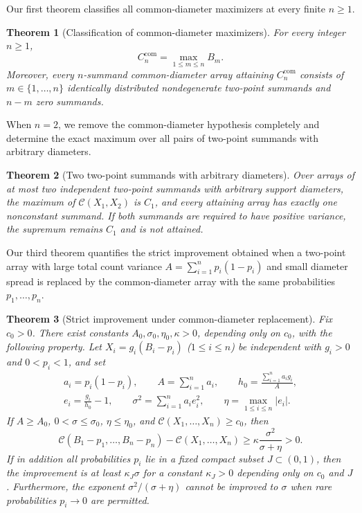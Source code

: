 \documentclass[11pt]{article}
\numberwithin{equation}{section}
\newtheorem{theorem}{Theorem}[section]
\theoremstyle{remark}
\begin{document}
Our first theorem classifies all common-diameter maximizers at every finite
$n\ge1$.

\begin{theorem}[Classification of common-diameter maximizers]\label{thm:common}
For every integer $n\ge1$,
\[
 C_n^{\mathrm{com}}=\max_{1\le m\le n}B_m.
\]
Moreover, every $n$-summand common-diameter array attaining
$C_n^{\mathrm{com}}$ consists of $m\in\{1,\ldots,n\}$ identically distributed
nondegenerate two-point summands and $n-m$ zero summands.
\end{theorem}

When $n=2$, we remove the common-diameter hypothesis completely and determine
the exact maximum over all pairs of two-point summands with arbitrary
diameters.

\begin{theorem}[Two two-point summands with arbitrary diameters]\label{thm:two}
Over arrays of at most two independent two-point summands with arbitrary
support diameters, the maximum of $\mathcal C(X_1,X_2)$ is $C_1$, and every
attaining array has exactly one nonconstant summand. If both summands are
required to have positive variance, the supremum remains $C_1$ and is not
attained.
\end{theorem}

Our third theorem quantifies the strict improvement obtained when a
two-point array with large total count variance $A=\sum_{i=1}^np_i(1-p_i)$
and small diameter spread is replaced by the common-diameter array with the
same probabilities $p_1,\ldots,p_n$.

\begin{theorem}[Strict improvement under common-diameter replacement]\label{thm:spread}
Fix $c_0>0$. There exist constants $A_0,\sigma_0,\eta_0,\kappa>0$, depending
only on $c_0$, with the following property. Let $X_i=g_i(B_i-p_i)$
($1\le i\le n$) be independent with $g_i>0$ and $0<p_i<1$, and set
\begin{gather*}
 a_i=p_i(1-p_i),\qquad A=\sum_{i=1}^n a_i,\qquad
 h_0=\frac{\sum_{i=1}^n a_i g_i}{A},\\
 e_i=\frac{g_i}{h_0}-1,
 \qquad\sigma^2=\sum_{i=1}^n a_i e_i^2,\qquad\eta=\max_{1\le i\le n}|e_i|.
\end{gather*}
If $A\ge A_0$, $0<\sigma\le\sigma_0$, $\eta\le\eta_0$, and
$\mathcal C(X_1,\ldots,X_n)\ge c_0$, then
\[
 \mathcal C(B_1-p_1,\ldots,B_n-p_n)-\mathcal C(X_1,\ldots,X_n)
                 \ge\kappa\frac{\sigma^2}{\sigma+\eta}>0.
\]
If in addition all probabilities $p_i$ lie in a fixed compact subset
$J\subset(0,1)$, then the improvement is at least $\kappa_J\sigma$ for a
constant $\kappa_J>0$ depending only on $c_0$ and $J$. Furthermore, the
exponent $\sigma^2/(\sigma+\eta)$ cannot be improved to $\sigma$ when rare
probabilities $p_i\to0$ are permitted.
\end{theorem}
\end{document}
